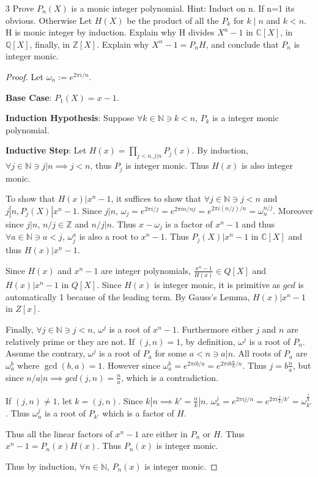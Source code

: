 \documentclass{article}
\newcommand{\C}{\mathbb{C}}
\newcommand{\Q}{\mathbb{Q}}
\newcommand{\Z}{\mathbb{Z}}
\newcommand{\N}{\mathbb{N}}
\begin{document}
\bigskip

\begin{PROB}{3}\label{Problem 3.}
    Prove $P_n(X)$ is a monic integer polynomial. Hint: Induct on n. If n=1 its obvious. Otherwise Let $H(X)$ be the product of all the $P_k$ for $k \mid n$ and $k < n$.  H is monic integer by induction. Explain why H divides $X^n -1$ in $\C[X]$,  in $\Q[X]$, finally, in $\Z[X]$.  Explain why $X^n-1 = P_n H$, and conclude that $P_n$ is integer monic.
\end{PROB}
\begin{proof}
    Let $\omega_n := e^{2 \pi i / n}$.

    \textbf{Base Case}: $P_1(X) = x - 1$.

    \textbf{Induction Hypothesis}: Suppose $\forall k \in \N \ni k < n$, $P_k$ is a integer monic polynomial.
    
    \textbf{Inductive Step}:  
    Let $H(x) = \prod_{j < n, j | n} P_j(x)$. By induction, $\forall j \in \N \ni j | n \implies j < n$, thus $P_j$ is integer monic. Thus $H(x)$ is also integer monic.  
    
    To show that $H(x) | x^n - 1$, it suffices to show that $\forall j \in \N \ni j < n$ and $j | n, P_j(X) | x^n - 1$. Since $j | n$, $\omega_j = e^{2 \pi i / j} = e^{2 \pi i n/nj} = e^{2 \pi i (n / j) / n} = \omega_n^{n / j}$. Moreover since $j | n$, $n / j \in \Z$ and $n / j | n$. Thus $x - \omega_j$ is a factor of $x^n - 1$ and thus $\forall a \in \N \ni a < j$, $\omega_j^a$ is also a root to $x^n - 1$. Thus $P_j(X) | x^n - 1$ in $\C[X]$ and thus $H(x) | x^n - 1$. 
    
    Since $H(x)$ and $x^n - 1$ are integer polynomials, $\frac{x^n - 1}{H(x)} \in Q[X]$ and $H(x) | x^n - 1$ in $Q[X]$. Since $H(x)$ is integer monic, it is primitive as $gcd$ is automatically 1 because of the leading term. By Gauss's Lemma, $H(x) | x^n - 1$ in $Z[x]$. 
    
    Finally, $\forall j \in \N \ni  j < n$, $\omega^j$ is a root of $x^n - 1$. Furthermore either $j$ and $n$ are relatively prime or they are not. If $(j , n) = 1$, by definition, $\omega^j$ is a root of $P_n$. Assume the contrary, $\omega^j$ is a root of $P_a$ for some $a < n \ni a | n$. All roots of $P_a$ are $\omega_a^b$ where $\gcd(b, a) = 1$. However since $\omega_a^b = e^{2 \pi i b / a} = e^{2 \pi i b \frac{n}{a} / n}$. Thus $j = b \frac{n}{a}$, but since $n /a | n \implies gcd(j, n) = \frac{n}{a}$, which is a contradiction. 
    
    If $(j, n) \neq 1$, let $k = (j, n)$. Since $k | n \implies k' = \frac{n}{k} | n$. $\omega_n^j = e^{2 \pi i j / n} = e^{2 \pi i \frac{j}{k} / k'} = \omega_{k'}^{\frac{j}{k}}$. Thus $\omega_n^j$ is a root of $P_{k'}$ which is a factor of $H$. 
    
    Thus all the linear factors of $x^n -1$ are either in $P_n$ or $H$. Thus $x^n - 1 = P_n(x) H(x)$. Thus $P_n(x)$ is integer monic. 
    
    
    Thus by induction, $\forall n \in \N$, $P_n(x)$ is integer monic.   
    
\end{proof}
\end{document}
